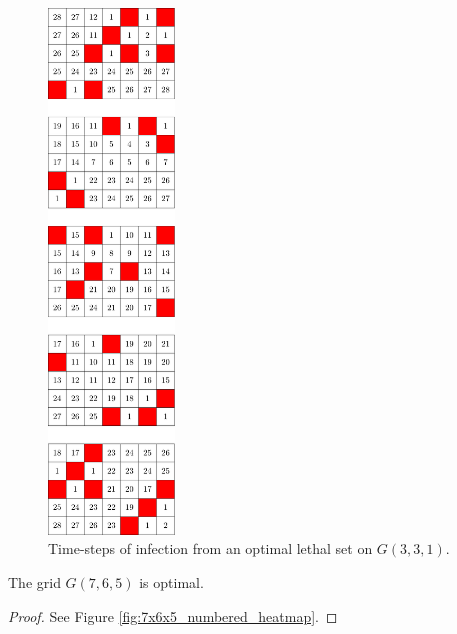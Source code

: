 \begin{figure}[H]
\centering
\includegraphics[width=0.3\textwidth]{figures/A/7x5x5_numbered_heatmap.pdf}
\caption{Time-steps of infection from an optimal lethal set on $G(3,3,1)$.}
\label{fig:7x5x5_numbered_heatmap}
\end{figure}

\newpage

\begin{con}
\label{con:7x6x5}
The grid $G(7,6,5)$ is optimal.
\end{con}

\begin{proof}
See Figure \ref{fig:7x6x5_numbered_heatmap}.
\end{proof}

